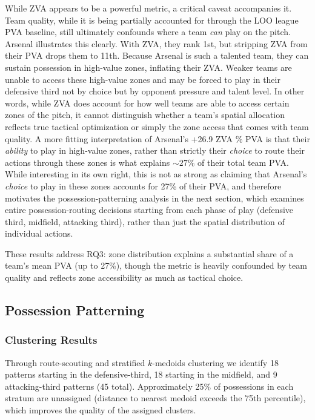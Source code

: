 \documentclass[12pt,a4paper]{article}
\begin{document}
While ZVA appears to be a powerful metric, a critical caveat accompanies it. Team quality, while it is being partially accounted for through the LOO league PVA baseline, still ultimately confounds where a team \emph{can} play on the pitch. Arsenal illustrates this clearly. With ZVA, they rank 1st, but stripping ZVA from their PVA drops them to 11th. Because Arsenal is such a talented team, they can sustain possession in high-value zones, inflating their ZVA. Weaker teams are unable to access these high-value zones and may be forced to play in their defensive third not by choice but by opponent pressure and talent level. In other words, while ZVA does account for how well teams are able to access certain zones of the pitch, it cannot distinguish whether a team's spatial allocation reflects true tactical optimization or simply the zone access that comes with team quality. A more fitting interpretation of Arsenal's +26.9 ZVA \% PVA is that their \emph{ability} to play in high-value zones, rather than strictly their \emph{choice} to route their actions through these zones is what explains ${\sim}27\%$ of their total team PVA. While interesting in its own right, this is not as strong as claiming that Arsenal's \emph{choice} to play in these zones accounts for 27\% of their PVA, and therefore motivates the possession-patterning analysis in the next section, which examines entire possession-routing decisions starting from each phase of play (defensive third, midfield, attacking third), rather than just the spatial distribution of individual actions. 

These results address RQ3: zone distribution explains a substantial share of a team's mean PVA (up to 27\%), though the metric is heavily confounded by team quality and reflects zone accessibility as much as tactical choice.

\subsection{Possession Patterning}

\subsubsection{Clustering Results}

Through route-scouting and stratified $k$-medoids clustering we identify 18 patterns starting in the defensive-third, 18 starting in the midfield, and 9 attacking-third patterns (45 total). Approximately 25\% of possessions in each stratum are unassigned (distance to nearest medoid exceeds the 75th percentile), which improves the quality of the assigned clusters.
\end{document}
